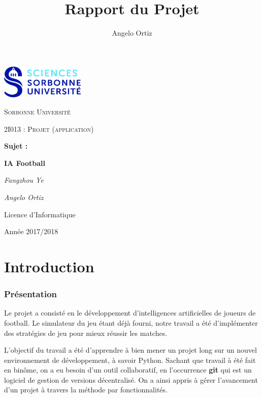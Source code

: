 \documentclass[12pt,a4paper]{article}
\author{Angelo Ortiz}
\title{Rapport du Projet}
\begin{document}
\begin{titlepage}
  \centering
  \includegraphics[width=0.30\textwidth]{logo.jpg}\par\vspace{1cm}
  {\scshape\LARGE Sorbonne Universit\'e\par}
  \vspace{1cm}
  {\scshape\Large 2I013 : Projet (application)\par}
  \vspace{1.5cm}
  {\Large \bfseries Sujet :\par}
  {\huge\bfseries IA Football\par}
  \vspace{2cm}
  {\Large\itshape Fangzhou Ye\par}
  {\Large\itshape Angelo Ortiz\par}
  \vfill
  
  {\large Licence d'Informatique\par}
  {\large Ann\'ee 2017/2018\par}
\end{titlepage}
 
\tableofcontents
  
\newpage
  
\part*{Introduction}
\section*{Pr\'esentation}
Le projet a consist\'e en le d\'eveloppement d'intelligences artificielles de 
joueurs de football. 
Le simulateur du jeu \'etant d\'ej\`a fourni, notre 
travail a \'et\'e d'impl\'ementer des strat\'egies de jeu pour mieux r\'eussir 
les matches.

L’objectif du travail a \'et\'e d'apprendre \`a bien mener un projet long 
sur un nouvel environnement de d\'eveloppement, \`a savoir 
Python. 
Sachant que travail \`a \'et\'e fait en bin\^ome, on a eu 
besoin d'un outil collaboratif, en l'occurrence {\bfseries git} qui est un 
logiciel de gestion de versions d\'ecentralis\'e. 
On a ainsi appris \`a g\'erer 
l'avancement d'un projet \`a travers la m\'ethode par fonctionnalit\'es.
\end{document}
